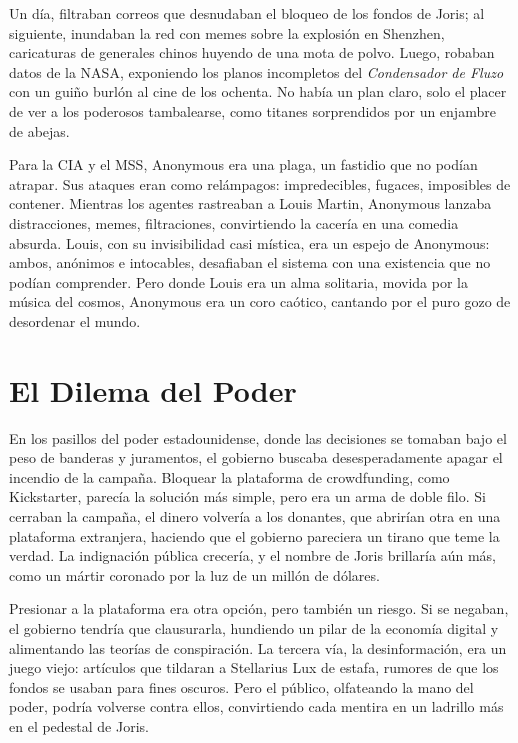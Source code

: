 Un día, filtraban correos que desnudaban el bloqueo de los fondos de Joris; al siguiente, inundaban la red con memes sobre la explosión en Shenzhen, caricaturas de generales chinos huyendo de una mota de polvo. Luego, robaban datos de la NASA, exponiendo los planos incompletos del \emph{Condensador de Fluzo} con un guiño burlón al cine de los ochenta. No había un plan claro, solo el placer de ver a los poderosos tambalearse, como titanes sorprendidos por un enjambre de abejas.

Para la CIA y el MSS, Anonymous era una plaga, un fastidio que no podían atrapar. Sus ataques eran como relámpagos: impredecibles, fugaces, imposibles de contener. Mientras los agentes rastreaban a Louis Martin, Anonymous lanzaba distracciones, memes, filtraciones, convirtiendo la cacería en una comedia absurda. Louis, con su invisibilidad casi mística, era un espejo de Anonymous: ambos, anónimos e intocables, desafiaban el sistema con una existencia que no podían comprender. Pero donde Louis era un alma solitaria, movida por la música del cosmos, Anonymous era un coro caótico, cantando por el puro gozo de desordenar el mundo.

\section{El Dilema del Poder}

En los pasillos del poder estadounidense, donde las decisiones se tomaban bajo el peso de banderas y juramentos, el gobierno buscaba desesperadamente apagar el incendio de la campaña. Bloquear la plataforma de crowdfunding, como Kickstarter, parecía la solución más simple, pero era un arma de doble filo. Si cerraban la campaña, el dinero volvería a los donantes, que abrirían otra en una plataforma extranjera, haciendo que el gobierno pareciera un tirano que teme la verdad. La indignación pública crecería, y el nombre de Joris brillaría aún más, como un mártir coronado por la luz de un millón de dólares.

Presionar a la plataforma era otra opción, pero también un riesgo. Si se negaban, el gobierno tendría que clausurarla, hundiendo un pilar de la economía digital y alimentando las teorías de conspiración. La tercera vía, la desinformación, era un juego viejo: artículos que tildaran a Stellarius Lux de estafa, rumores de que los fondos se usaban para fines oscuros. Pero el público, olfateando la mano del poder, podría volverse contra ellos, convirtiendo cada mentira en un ladrillo más en el pedestal de Joris.

